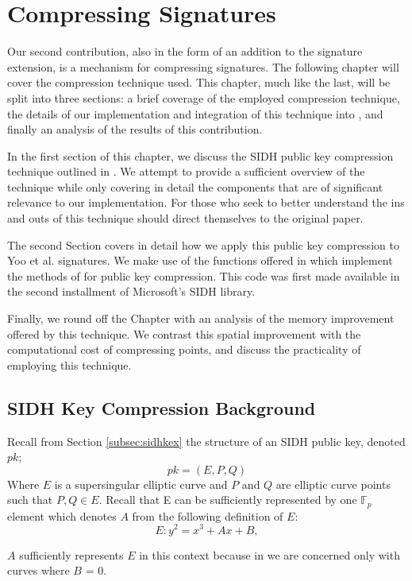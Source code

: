 \chapter{Compressing Signatures}
\label{sec:compress}

Our second contribution, also in the form of an addition to the \sidh signature extension, is a mechanism for compressing signatures. The following chapter will cover the compression technique used. This chapter, much like the last, will be split into three sections: a brief coverage of the employed compression technique, the details of our implementation and integration of this technique into \sidh, and finally an analysis of the results of this contribution.

In the first section of this chapter, we discuss the SIDH public key compression technique outlined in \cite{compwr}. We attempt to provide a sufficient overview of the technique while only covering in detail the components that are of significant relevance to our implementation. For those who seek to better understand the ins and outs of this technique should direct themselves to the original paper.  

The second Section covers in detail how we apply this public key compression to Yoo et al. signatures. We make use of the functions offered in \cite{pkcomp} which implement the methods of \cite{compwr} for public key compression. This code was first made available in the second installment of Microsoft's SIDH library.

Finally, we round off the Chapter with an analysis of the memory improvement offered by this technique. We contrast this spatial improvement with the computational cost of compressing points, and discuss the practicality of employing this technique. 

\section{SIDH Key Compression Background}

Recall from Section \ref{subsec:sidhkex} the structure of an SIDH public key, denoted $pk$;
$$
pk = (E, P, Q)
$$
Where $E$ is a supersingular elliptic curve and $P$ and $Q$ are elliptic curve points such that $P, Q \in E$. Recall that E can be sufficiently represented by one $\mathbb{F}_{p}$ element which denotes $A$ from the following definition of $E$:
$$
E : y^2 = x^3 + Ax + B,
$$

$A$ sufficiently represents $E$ in this context because in \sidh we are concerned only with curves where $B$ = 0. 

